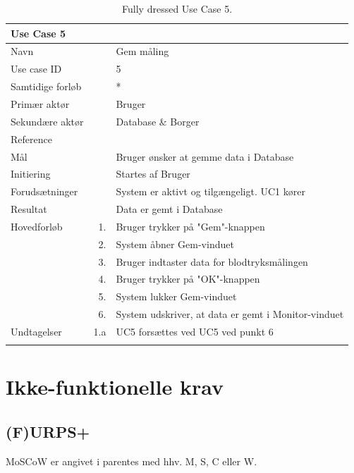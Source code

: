 \begin{longtabu} to  %
    {\large \textbf{Use Case 5}} && \\
    \toprule
    Navn &&    Gem måling\\
    Use case ID &&    5\\
    Samtidige forløb &&   *\\
    Primær aktør &&    Bruger\\
    Sekundære aktør &&	Database \& Borger \\
    Reference &&      \\
    Mål &&    Bruger ønsker at gemme data i Database\\
    Initiering &&	Startes af Bruger\\
    Forudsætninger &&  System er aktivt og tilgængeligt. UC1 kører  \\
    Resultat &&		Data er gemt i Database                 \\ \midrule
    Hovedforløb &    1. &    Bruger trykker på "Gem"\--knappen \\	
                &    2. &    System åbner Gem-vinduet\\[-1ex]
                &    3.	&	 Bruger indtaster data for blodtryksmålingen \\[-1ex]
                &	 4. &    Bruger trykker på "OK"\--knappen  \\[-1ex]
                &	 5.	&	 System lukker Gem-vinduet\\[-1ex]
                &	 6.	&	 System udskriver, at data er gemt i Monitor-vinduet\newline
                
                \\ \midrule
                
    Undtagelser &   1.a  &  UC5 forsættes ved UC5 ved punkt 6    \\ \bottomrule
\caption{Fully dressed Use Case 5.}
\label{UC5}
\end{longtabu}


\section{Ikke-funktionelle krav}


\subsection{(F)URPS+}
MoSCoW er angivet i parentes med hhv. M, S, C eller W.

